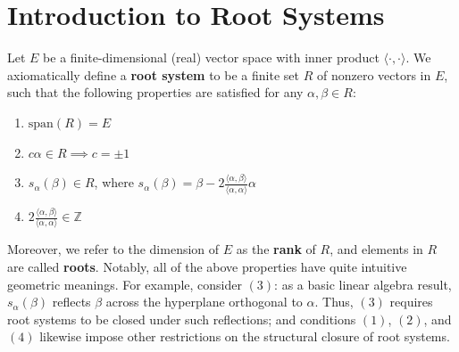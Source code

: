 \documentclass{article}
\theoremstyle{definition}
\begin{document}
\section{Introduction to Root Systems}
\quad Let $E$ be a finite-dimensional (real) vector space with inner product $\langle\cdot,\cdot\rangle$. We axiomatically define a \textbf{root system} to be a finite set $R$ of nonzero vectors in $E$, such that the following properties are satisfied for any $\alpha,\beta\in R$: 
\begin{enumerate}
    \item $\mbox{span}(R)=E$
    \item $c\alpha\in R\implies c=\pm1$
    \item $s_\alpha(\beta)\in R$, where $s_\alpha(\beta)=\beta-2\frac{\langle\alpha,\beta\rangle}{\langle\alpha,\alpha\rangle}\alpha$
    \item $2\frac{\langle\alpha,\beta\rangle}{\langle\alpha,\alpha\rangle}\in\mathbb{Z}$
\end{enumerate}
\quad Moreover, we refer to the dimension of $E$ as the \textbf{rank} of $R$, and elements in $R$ are called \textbf{roots}. Notably, all of the above properties have quite intuitive geometric meanings. For example, consider $(3)$: as a basic linear algebra result, $s_\alpha(\beta)$ reflects $\beta$ across the hyperplane orthogonal to $\alpha$. Thus, $(3)$ requires root systems to be closed under such reflections; and conditions $(1)$, $(2)$, and $(4)$ likewise impose other restrictions on the structural closure of root systems. \\
\end{document}
